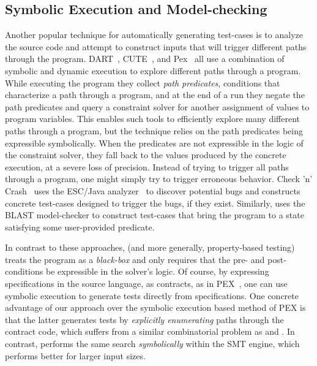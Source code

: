 \subsection{Symbolic Execution and Model-checking}
\label{sec:static-analysis}
Another popular technique for automatically generating test-cases is to analyze
the source code and attempt to construct inputs that will trigger different
paths through the program. DART~\cite{DART}, CUTE~\cite{CUTE}, 
and Pex~\cite{tillmann_pexwhite_2008} all use a
combination of symbolic and dynamic execution to explore different paths through
a program. 
%
While executing the program they collect \emph{path predicates},
conditions that characterize a path through a program, and at the end of a run
they negate the path predicates and query a constraint solver for another
assignment of values to program variables. This enables such tools to
efficiently explore many different paths through a program, but the technique
relies on the path predicates being expressible symbolically. When the
predicates are not expressible in the logic of the constraint solver, they fall
back to the values produced by the concrete execution, at a severe loss of
precision.
%
Instead of trying to trigger all paths through a program, one might 
simply try to trigger erroneous behavior. 
%
Check 'n' Crash~\cite{jcrasher} uses the ESC/Java analyzer~\cite{ESCJava} to discover
potential bugs and constructs concrete test-cases designed to trigger 
the bugs, if they exist. Similarly, \cite{ICSE04BLAST} uses the BLAST 
model-checker to construct test-cases that bring the program to 
a state satisfying some user-provided predicate.

In contrast to these approaches, \toolname (and more generally, property-based testing) 
treats the program as a \emph{black-box} and only requires that the pre- and 
post-conditions be expressible in the solver's logic. 
%
Of course, by expressing specifications in the source language, 
\eg as contracts, as in PEX~\cite{tillmann_pexwhite_2008}, one can use symbolic
execution to generate tests directly from specifications.
%
One concrete advantage of our approach over the symbolic execution based method
of PEX is that the latter generates tests by \emph{explicitly enumerating} paths
through the contract code, which suffers from a similar combinatorial 
problem as \smallcheck and \quickcheck. In contrast, \toolname performs the 
same search \emph{symbolically} within the SMT engine, which %
performs better for larger input sizes.


